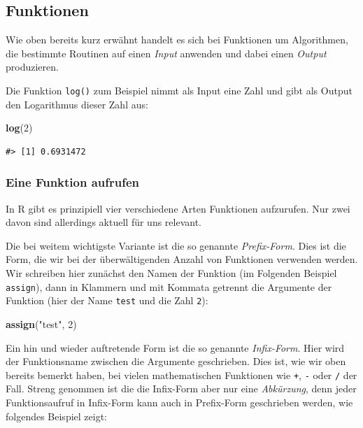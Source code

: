 \documentclass[]{book}
\newenvironment{Shaded}{\begin{snugshade}}{\end{snugshade}}
\newcommand{\KeywordTok}[1]{\textcolor[rgb]{0.13,0.29,0.53}{\textbf{#1}}}
\newcommand{\DecValTok}[1]{\textcolor[rgb]{0.00,0.00,0.81}{#1}}
\newcommand{\StringTok}[1]{\textcolor[rgb]{0.31,0.60,0.02}{#1}}
\newcommand{\NormalTok}[1]{#1}
\begin{document}
\subsection{Funktionen}\label{funktionen}

Wie oben bereits kurz erwähnt handelt es sich bei Funktionen um
Algorithmen, die bestimmte Routinen auf einen \emph{Input} anwenden und
dabei einen \emph{Output} produzieren.

Die Funktion \texttt{log()} zum Beispiel nimmt als Input eine Zahl und
gibt als Output den Logarithmus dieser Zahl aus:

\begin{Shaded}
\begin{Highlighting}[]
\KeywordTok{log}\NormalTok{(}\DecValTok{2}\NormalTok{)}
\end{Highlighting}
\end{Shaded}

\begin{verbatim}
#> [1] 0.6931472
\end{verbatim}

\subsubsection{Eine Funktion aufrufen}\label{eine-funktion-aufrufen}

In R gibt es prinzipiell vier verschiedene Arten Funktionen aufzurufen.
Nur zwei davon sind allerdings aktuell für uns relevant.

Die bei weitem wichtigste Variante ist die so genannte
\emph{Prefix-Form}. Dies ist die Form, die wir bei der überwältigenden
Anzahl von Funktionen verwenden werden. Wir schreiben hier zunächst den
Namen der Funktion (im Folgenden Beispiel \texttt{assign}), dann in
Klammern und mit Kommata getrennt die Argumente der Funktion (hier der
Name \texttt{test} und die Zahl \texttt{2}):

\begin{Shaded}
\begin{Highlighting}[]
\KeywordTok{assign}\NormalTok{(}\StringTok{"test"}\NormalTok{, }\DecValTok{2}\NormalTok{)}
\end{Highlighting}
\end{Shaded}

Ein hin und wieder auftretende Form ist die so genannte
\emph{Infix-Form}. Hier wird der Funktionsname zwischen die Argumente
geschrieben. Dies ist, wie wir oben bereits bemerkt haben, bei vielen
mathematischen Funktionen wie \texttt{+}, \texttt{-} oder \texttt{/} der
Fall. Streng genommen ist die die Infix-Form aber nur eine
\emph{Abkürzung}, denn jeder Funktionsaufruf in Infix-Form kann auch in
Prefix-Form geschrieben werden, wie folgendes Beispiel zeigt:
\end{document}
